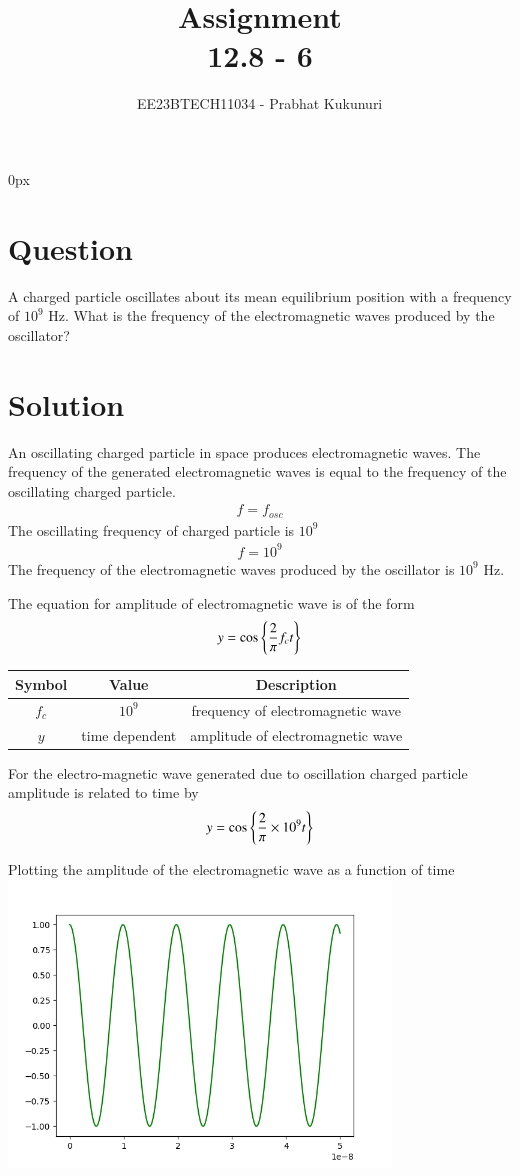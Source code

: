 \documentclass[journal,12pt,twocolumn]{IEEEtran}
\theoremstyle{remark}
\begin{document}
\parindent 0px


\title{Assignment\\[1ex]12.8 - 6}
\author{EE23BTECH11034 - Prabhat Kukunuri$^{}$%
}
\maketitle
\newpage
\bigskip

\renewcommand{\thefigure}{\theenumi}
\renewcommand{\thetable}{\theenumi}
\section*{Question}
A charged particle oscillates about its mean equilibrium position with a frequency of $10^9$ Hz. What is the frequency of the electromagnetic waves produced by the oscillator?

\section*{Solution}
An oscillating charged particle in space produces electromagnetic waves. The frequency of the generated electromagnetic waves is equal to the frequency of the oscillating charged particle.
\begin{align}
    f = f_{osc}
\end{align}
The oscillating frequency of charged particle is $10^9$
\begin{align}
    f = 10^9
\end{align}
The frequency of the electromagnetic waves produced by the oscillator is $10^9$ Hz.

The equation for amplitude of electromagnetic wave is of the form 
\begin{align}
    y = \cos\left\{{\dfrac{2}{\pi}f_ct}\right\}
\end{align}
\begin{tabular}{|c|c|c|}
   \hline
   Symbol&Value&Description\\ \hline
   $f_c$&$10^9$&frequency of electromagnetic wave\\ \hline
   $y$&time dependent&amplitude of electromagnetic wave\\ \hline
\end{tabular}

For the electro-magnetic wave generated due to oscillation charged particle amplitude is related to time by
\begin{align}
    y = \cos\left\{{\dfrac{2}{\pi}\times 10^9 t}\right\}
\end{align}

Plotting the amplitude of the electromagnetic wave as a function of time
\includegraphics[width=4in,height=3in,inner]{Figure_1.png}
\end{document}
